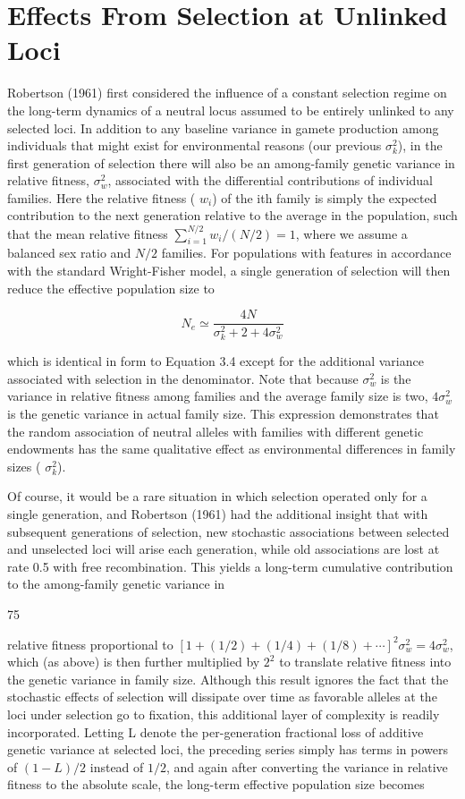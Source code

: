 \documentclass{article}
\begin{document}
\section{Effects From Selection at Unlinked Loci}
Robertson (1961) first considered the influence of a constant selection regime on the long-term dynamics of a neutral locus assumed to be entirely unlinked to any selected loci. In addition to any baseline variance in gamete production among individuals that might exist for environmental reasons (our previous  $ \sigma_k^2 $), in the first generation of selection there will also be an among-family genetic variance in relative fitness,  $ \sigma_w^2 $, associated with the differential contributions of individual families. Here the relative fitness ( $ w_i $) of the ith family is simply the expected contribution to the next generation relative to the average in the population, such that the mean relative fitness  $ \sum_{i=1}^{N/2} w_i / (N/2) = 1 $, where we assume a balanced sex ratio and  $ N/2 $ families. For populations with features in accordance with the standard Wright-Fisher model, a single generation of selection will then reduce the effective population size to

\begin{equation}
N_{e}\simeq\frac{4N}{\sigma_{k}^{2}+2+4\sigma_{w}^{2}}
\tag{3.29a}
\label{eq:3_29a}
\end{equation}

which is identical in form to Equation 3.4 except for the additional variance associated with selection in the denominator. Note that because  $ \sigma_w^2 $ is the variance in relative fitness among families and the average family size is two,  $ 4\sigma_w^2 $ is the genetic variance in actual family size. This expression demonstrates that the random association of neutral alleles with families with different genetic endowments has the same qualitative effect as environmental differences in family sizes ( $ \sigma_k^2 $).

Of course, it would be a rare situation in which selection operated only for a single generation, and Robertson (1961) had the additional insight that with subsequent generations of selection, new stochastic associations between selected and unselected loci will arise each generation, while old associations are lost at rate 0.5 with free recombination. This yields a long-term cumulative contribution to the among-family genetic variance in

75

relative fitness proportional to  $ [1+(1/2)+(1/4)+(1/8)+\cdots]^{2}\sigma_{w}^{2}=4\sigma_{w}^{2} $, which (as above) is then further multiplied by  $ 2^{2} $ to translate relative fitness into the genetic variance in family size. Although this result ignores the fact that the stochastic effects of selection will dissipate over time as favorable alleles at the loci under selection go to fixation, this additional layer of complexity is readily incorporated. Letting L denote the per-generation fractional loss of additive genetic variance at selected loci, the preceding series simply has terms in powers of  $ (1-L)/2 $ instead of  $ 1/2 $, and again after converting the variance in relative fitness to the absolute scale, the long-term effective population size becomes
\end{document}
